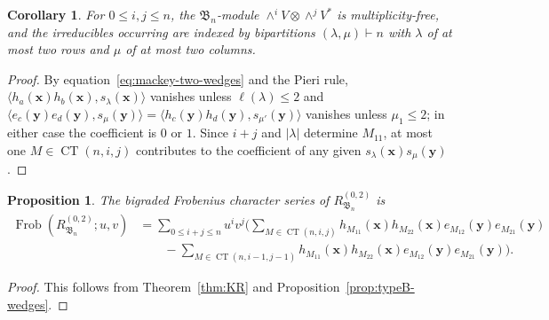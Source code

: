 \documentclass[12pt]{amsart}
\theoremstyle{plain}
\newtheorem{proposition}[theorem]{Proposition}
\newtheorem{corollary}[theorem]{Corollary}
\theoremstyle{definition}
\DeclareMathOperator{\Frob}{Frob}
\DeclareMathOperator{\CT}{CT}
\newcommand{\x}{\mathbf{x}}
\newcommand{\y}{\mathbf{y}}
\begin{document}
\begin{corollary}\label{cor:wedges-mult-free}
    For $0 \leq i,j \leq n$, the $\mathfrak{B}_n$-module $\wedge^i V \otimes \wedge^j V^*$ is multiplicity-free, and the irreducibles occurring are indexed by bipartitions $(\lambda,\mu) \vdash n$ with $\lambda$ of at most two rows and $\mu$ of at most two columns.
\end{corollary}

\begin{proof}
    By equation~\eqref{eq:mackey-two-wedges} and the Pieri rule, $\langle h_a(\x)h_b(\x), s_\lambda(\x)\rangle$ vanishes unless $\ell(\lambda) \leq 2$ and $\langle e_c(\y)e_d(\y), s_\mu(\y)\rangle = \langle h_c (\y)h_d(\y), s_{\mu'}(\y)\rangle$ vanishes unless $\mu_1 \leq 2$; in either case the coefficient is $0$ or $1$. 
    Since $i+j$ and $|\lambda|$ determine $M_{11}$, at most one $M \in \CT(n,i,j)$ contributes to the coefficient of any given $s_\lambda(\x)s_\mu(\y)$.
\end{proof}

\begin{proposition}\label{prop:module-structure}
    The bigraded Frobenius character series of $R_{\mathfrak{B}_n}^{(0,2)}$ is
\begin{equation}
\begin{aligned}
\Frob(R_{\mathfrak{B}_n}^{(0,2)}; u, v) &= \sum_{0 \leq i+j \leq n} u^i v^j \Bigg( \sum_{M \in \CT(n,i,j)} h_{M_{11}}(\x)h_{M_{22}}(\x) e_{M_{12}}(\y) e_{M_{21}}(\y) \\
&\qquad- \sum_{M \in \CT(n,i-1,j-1)} h_{M_{11}}(\x)h_{M_{22}}(\x) e_{M_{12}}(\y) e_{M_{21}}(\y)\Bigg).
\end{aligned}
\end{equation}
\end{proposition}

\begin{proof}
    This follows from Theorem~\ref{thm:KR} and Proposition~\ref{prop:typeB-wedges}.
\end{proof}
\end{document}
